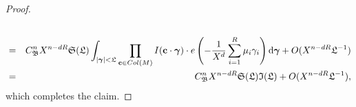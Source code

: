 \documentclass[10pt,a4paper]{amsart}
\numberwithin{equation}{section}
\newcommand{\bgamma}{\boldsymbol{\gamma}}
\renewcommand{\c}{\mathbf{c}}
\begin{document}
\begin{proof}
\begin{eqnarray}
\\
\notag
&=&
C_{\mathfrak{B}}^n  X^{n- d R }  \mathfrak{S} (\mathfrak{L}) \int_{\vert \bgamma \vert <  \mathfrak{L} }
\prod_{\c \in \textnormal{Col}( M )} I( \c\cdot \bgamma )  \cdot   e \left( - \frac{ 1 }{X^d}   \sum_{i=1}^{R}  \mu_i \gamma_i    \right) \mathrm{d}\bgamma
+ O ( X^{ n - d R} \mathfrak{L}^{ -1 } )
\\
\notag
&=&
C_{\mathfrak{B}}^n  X^{n - d R} \mathfrak{S} (\mathfrak{L}) \mathfrak{I} (\mathfrak{L}) + O ( X^{ n - d R} \mathfrak{L}^{ -1 }),
\end{eqnarray}
which completes the claim.
\end{proof}
\end{document}
